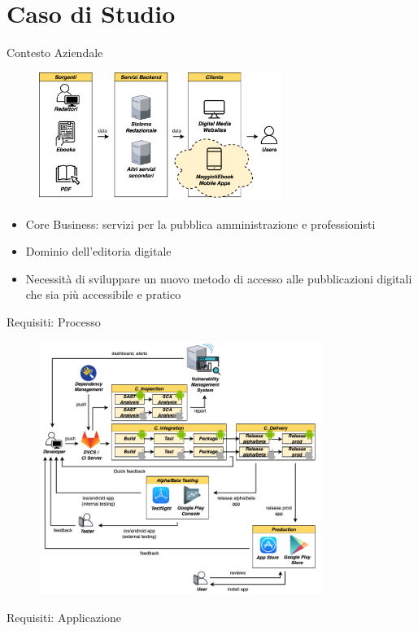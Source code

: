 
\section{Caso di Studio}

\begin{frame}{Contesto Aziendale}
    \begin{figure}[H]
        \includegraphics[width=0.7\textwidth]{img/contesto-aziendale.png}
    \end{figure}
    \begin{itemize}
        \item Core Business: servizi per la pubblica amministrazione e professionisti
        \item Dominio dell'editoria digitale
        \item Necessità di sviluppare un nuovo metodo di accesso alle pubblicazioni digitali che sia più accessibile e pratico
    \end{itemize}
\end{frame}

\begin{frame}{Requisiti: Processo}
    
\end{frame}

\begin{frame}
    \begin{figure}[H]
        \includegraphics[width=0.82\textwidth]{img/full-cicd.png}
    \end{figure}
\end{frame}

\begin{frame}{Requisiti: Applicazione}

\end{frame}